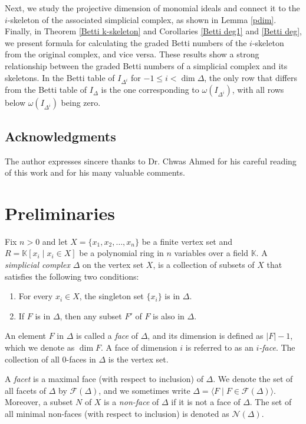 \documentclass[a4paper,12pt]{amsart}
\numberwithin{equation}{section}
\theoremstyle{definition}
\newcommand{\K}[0]{\mathbb{K}}
\begin{document}
Next, we study the projective dimension of monomial ideals and connect it to the $i$-skeleton of the associated simplicial complex, as shown in Lemma \ref{pdim}. Finally, in Theorem \ref{Betti k-skeleton} and Corollaries \ref{Betti deg1} and \ref{Betti deg}, we present formula for calculating the graded Betti numbers of the $i$-skeleton from the original complex, and vice versa. These results show a strong relationship between the graded Betti numbers of a simplicial complex and its skeletons. In the Betti table of $I_{\Delta^i}$ for $-1\le i<\dim\Delta$, the only row that differs from the Betti table of $I_{\Delta}$ is the one corresponding to $\omega(I_{\Delta^i})$, with all rows below $\omega(I_{\Delta^i})$ being zero.

\subsection*{Acknowledgments}
The author expresses sincere thanks to Dr. Chwas Ahmed for his careful reading of this work and for his many valuable comments.

\section{Preliminaries}
Fix $n>0$ and let $X=\{x_1,x_2,\dots,x_n\}$ be a finite vertex set and $R=\K[x_i\mid x_i\in X]$ be a polynomial ring in $n$ variables over a field $\K$. A \emph{simplicial complex} $\Delta$ on the vertex set $X$, is a collection of subsets of $X$ that satisfies the following two conditions:
\begin{enumerate}
	\item For every $x_i\in X$, the singleton set $\{x_i\}$ is in $\Delta$.
	\item If $F$ is in $\Delta$, then any subset $F'$ of $F$ is also in $\Delta$.
\end{enumerate}

An element $F$ in $\Delta$ is called a \emph{face} of $\Delta$, and its dimension is defined as $|F|-1$, which we denote as $\dim F$. A face of dimension $i$ is referred to as an \emph{$i$-face}. The collection of all $0$-faces in $\Delta$ is the vertex set. 

A \emph{facet} is a maximal face (with respect to inclusion) of $\Delta$. We denote the set of all facets of $\Delta$ by $\mathcal{F}(\Delta)$, and we sometimes write $\Delta=\langle F\mid F\in\mathcal{F}(\Delta)\rangle$. Moreover, a subset $N$ of $X$ is a \emph{non-face} of $\Delta$ if it is not a face of $\Delta$. The set of all minimal non-faces (with respect to inclusion) is denoted as $\mathcal{N}(\Delta)$. 
\end{document}
